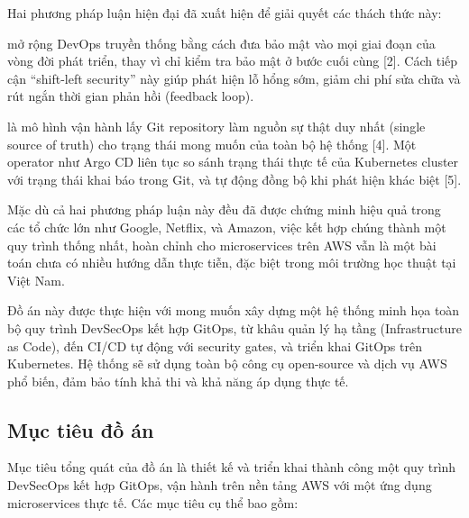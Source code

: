 \documentclass[13pt,a4paper,twoside]{extarticle}
\begin{document}
Hai phương pháp luận hiện đại đã xuất hiện để giải quyết các thách thức này:

\begin{description}[leftmargin=*,nosep]
  \item[DevSecOps] mở rộng DevOps truyền thống bằng cách đưa bảo mật vào mọi giai đoạn của vòng đời phát triển, thay vì chỉ kiểm tra bảo mật ở bước cuối cùng [2]. Cách tiếp cận ``shift-left security'' này giúp phát hiện lỗ hổng sớm, giảm chi phí sửa chữa và rút ngắn thời gian phản hồi (feedback loop).
  \item[GitOps] là mô hình vận hành lấy Git repository làm nguồn sự thật duy nhất (single source of truth) cho trạng thái mong muốn của toàn bộ hệ thống [4]. Một operator như Argo CD liên tục so sánh trạng thái thực tế của Kubernetes cluster với trạng thái khai báo trong Git, và tự động đồng bộ khi phát hiện khác biệt [5].
\end{description}

Mặc dù cả hai phương pháp luận này đều đã được chứng minh hiệu quả trong các tổ chức lớn như Google, Netflix, và Amazon, việc kết hợp chúng thành một quy trình thống nhất, hoàn chỉnh cho microservices trên AWS vẫn là một bài toán chưa có nhiều hướng dẫn thực tiễn, đặc biệt trong môi trường học thuật tại Việt Nam.

Đồ án này được thực hiện với mong muốn xây dựng một hệ thống minh họa toàn bộ quy trình DevSecOps kết hợp GitOps, từ khâu quản lý hạ tầng (Infrastructure as Code), đến CI/CD tự động với security gates, và triển khai GitOps trên Kubernetes. Hệ thống sẽ sử dụng toàn bộ công cụ open-source và dịch vụ AWS phổ biến, đảm bảo tính khả thi và khả năng áp dụng thực tế.

\subsection{Mục tiêu đồ án}

Mục tiêu tổng quát của đồ án là thiết kế và triển khai thành công một quy trình DevSecOps kết hợp GitOps, vận hành trên nền tảng AWS với một ứng dụng microservices thực tế. Các mục tiêu cụ thể bao gồm:
\end{document}

